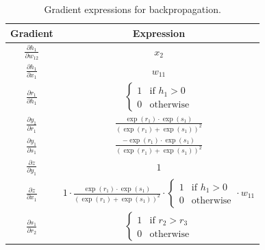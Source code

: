 \documentclass[a3paper,12pt]{extarticle} %
\begin{document}
\begin{enumerate}
\begin{enumerate}
\begin{table}[h!]
\centering
\begin{tabular}{|c|c|}
\hline
\textbf{Gradient} & \textbf{Expression} \\ \hline
$\frac{\partial h_1}{\partial w_{12}}$ & $x_2$ \\ \hline
$\frac{\partial h_1}{\partial x_1}$ & $w_{11}$ \\ \hline
$\frac{\partial r_1}{\partial h_1}$ & $\begin{cases} 1 & \text{if } h_1 > 0 \\ 0 & \text{otherwise} \end{cases}$ \\ \hline
$\frac{\partial y_1}{\partial r_1}$ & $\frac{\exp(r_1) \cdot \exp(s_1)}{(\exp(r_1) + \exp(s_1))^2}$ \\ \hline
$\frac{\partial y_1}{\partial s_1}$ & $\frac{-\exp(r_1) \cdot \exp(s_1)}{(\exp(r_1) + \exp(s_1))^2}$ \\ \hline
$\frac{\partial z}{\partial y_1}$ & $1$ \\ \hline
$\frac{\partial z}{\partial x_1}$ & $1 \cdot \frac{\exp(r_1) \cdot \exp(s_1)}{(\exp(r_1) + \exp(s_1))^2} \cdot \begin{cases} 1 & \text{if } h_1 > 0 \\ 0 & \text{otherwise} \end{cases} \cdot w_{11}$ \\ \hline
$\frac{\partial s_1}{\partial r_2}$ & $\begin{cases} 1 & \text{if } r_2 > r_3 \\ 0 & \text{otherwise} \end{cases}$ \\ \hline
\end{tabular}
\caption{Gradient expressions for backpropagation.}
\label{table:gradients}
\end{table}

\end{enumerate}

\end{enumerate}
\newpage
\end{document}
